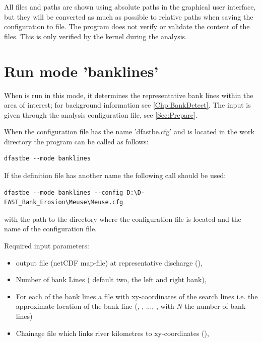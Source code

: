 \Note All files and paths are shown using absolute paths in the graphical user interface, but they will be converted as much as possible to relative paths when saving the configuration to file.
The program does not verify or validate the content of the files.
This is only verified by the kernel during the analysis.

\section{Run mode 'banklines'} \label{Sec:rundetect}

When \dfastbe is run in this mode, it determines the representative bank lines within the area of interest; for background information see \autoref{Chp:BankDetect}.
The input is given through the analysis configuration file, see \autoref{Sec:Prepare}.

When the configuration file has the name 'dfastbe.cfg' and is located in the work directory the program can be called as follows:

\begin{Verbatim}
dfastbe --mode banklines
\end{Verbatim}

If the definition file has another name the following call should be used:

\begin{Verbatim}
dfastbe --mode banklines --config D:\D-FAST_Bank_Erosion\Meuse\Meuse.cfg
\end{Verbatim}

with  the path to the directory where the configuration file is located and  the name of the configuration file.

Required input parameters:

\begin{itemize}
\item \dflowfm output file (netCDF map-file) at representative discharge (),
\item Number of bank Lines ( default two, the left and right bank),
\item For each of the bank lines a file with xy-coordinates of the search lines i.e. the approximate location of the bank line (, , ..., , with $N$ the number of bank lines)
\item Chainage file which links river kilometres to xy-coordinates (),
\end{itemize}

